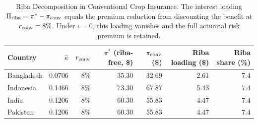 \begin{table}
\caption{Riba Decomposition in Conventional Crop Insurance. The interest loading $\Pi_{\rm riba}=\pi^*-\pi_{\rm conv}$ equals the premium reduction from discounting the benefit at $r_{\rm conv}=8\%$. Under $\iota=0$, this loading vanishes and the full actuarial risk premium is retained.}
\label{tab:riba_decomp}
\begin{tabular}{lrrrrrr}
\toprule
Country & $\hat{\kappa}$ & $r_{\rm conv}$ & $\pi^*$ (riba-free, \$) & $\pi_{\rm conv}$ (\$) & Riba loading (\$) & Riba share (\%) \\
\midrule
Bangladesh & 0.0706 & 8\% & 35.30 & 32.69 & 2.61 & 7.4 \\
Indonesia & 0.1466 & 8\% & 73.30 & 67.87 & 5.43 & 7.4 \\
India & 0.1206 & 8\% & 60.30 & 55.83 & 4.47 & 7.4 \\
Pakistan & 0.1206 & 8\% & 60.30 & 55.83 & 4.47 & 7.4 \\
\bottomrule
\end{tabular}
\end{table}
